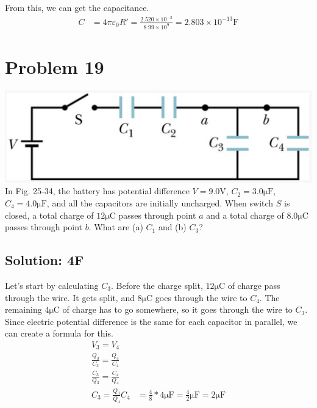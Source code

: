 \documentclass[12pt]{article}
\begin{document}
From this, we can get the capacitance.
\begin{align*}
    C   &=  4\pi\varepsilon_0 R'
        =   \frac{2.520 \times 10^{-3}}{8.99 \times 10^9}
        =   \boxed{2.803 \times 10^{-13} \unit{\farad}}
\end{align*}

\pagebreak
\section{Problem 19}
    \includegraphics[width=\textwidth]{picture_4.png} 
In Fig. 25-34, the battery has potential difference $V = 9.0\unit{\volt}$, $C_2 = 3.0\unit{\micro\farad}$, $C_4 = 4.0\unit{\micro\farad}$, and all the capacitors are initially uncharged. 
When switch $S$ is closed, a total charge of $12 \unit{\micro\coulomb}$ passes through point $a$ and a total charge of $8.0 \unit{\micro\coulomb}$ passes through point $b$. 
What are (a) $C_1$ and (b) $C_3$?

\subsection{Solution: 4\textmu F}
Let's start by calculating $C_3$. 
Before the charge split, $12\unit{\micro\coulomb}$ of charge pass through the wire. 
It gets split, and $8\unit{\micro\coulomb}$ goes through the wire to $C_4$. 
The remaining $4\unit{\micro\coulomb}$ of charge has to go somewhere, so it goes through the wire to $C_3$.
Since electric potential difference is the same for each capacitor in parallel, we can create a formula for this.
\begin{align*}
    V_3 = V_4\\
    \frac{Q_3}{C_3} = \frac{Q_4}{C_4}\\
    \frac{C_3}{Q_3} = \frac{C_4}{Q_4}\\
    C_3 = \frac{Q_3}{Q_4}C_4
        &=  \frac{4}{8}*4 \unit{\micro\farad}
        =   \frac{4}{2} \unit{\micro\farad}
        =   2 \unit{\micro\farad}
\end{align*}
\end{document}

